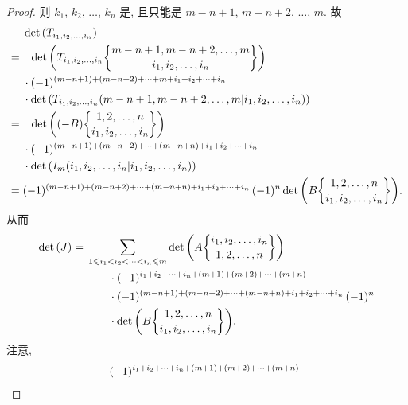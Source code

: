 \documentclass[../libro.tex]{subfiles}
\begin{document}
\begin{proof}
    则 \(k_1\), \(k_2\), \(\dots\), \(k_n\)
    是, 且只能是
    \(m-n+1\), \(m-n+2\), \(\dots\), \(m\).
    故
    \begin{align*}
        & \det {(T_{i_1,i_2,\dots,i_n})}
        \\
        = {} &
        \hphantom{\cdot\,\,}
        \det {\left(
                T_{i_1,i_2,\dots,i_n}
                \submat{m-n+1,m-n+2,\dots,m}{i_1,i_2,\dots,i_n}
        \right)}
        \\
        &
        \cdot (-1)^{(m-n+1) + (m-n+2) + \dots + m
        + i_1 + i_2 + \dots + i_n}
        \\
        &
        \cdot
        \det {(T_{i_1,i_2,\dots,i_n}
        ({m-n+1,m-n+2,\dots,m}|{i_1,i_2,\dots,i_n}))}
        \\
        = {} &
        \hphantom{\cdot\,\,}
        \det {\left(
                (-B)
                \submat{1,2,\dots,n}{i_1,i_2,\dots,i_n}
        \right)}
        \\
        & \cdot
        (-1)^{(m-n+1) + (m-n+2) + \dots + (m-n+n)
        + i_1 + i_2 + \dots + i_n}
        \\
        & \cdot
        \det {(I_m
        ({i_1,i_2,\dots,i_n}|{i_1,i_2,\dots,i_n}))}
        \\
        = {} &
        (-1)^{(m-n+1) + (m-n+2) + \dots + (m-n+n)
        + i_1 + i_2 + \dots + i_n}\,
        (-1)^n
        \det {\left(
                B
                \submat{1,2,\dots,n}{i_1,i_2,\dots,i_n}
        \right)}.
    \end{align*}
    从而
    \begin{align*}
        \det {(J)}
        = {} & \sum_{1 \leq i_1 < i_2 < \dots < i_n \leq m}
        {\det {\left(
                    A\submat{i_1,i_2,\dots,i_n}{1,2,\dots,n}
        \right)}}
        \\
        & \qquad
        \cdot
        (-1)^{i_1 + i_2 + \dots + i_n
        + (m+1) + (m+2) + \dots + (m+n)}
        \\
        & \qquad
        \cdot
        (-1)^{(m-n+1) + (m-n+2) + \dots + (m-n+n)
        + i_1 + i_2 + \dots + i_n}\, (-1)^n
        \\
        & \qquad
        \cdot
        \det {\left(
                B
                \submat{1,2,\dots,n}{i_1,i_2,\dots,i_n}
        \right)}.
    \end{align*}
    注意,
    \begin{align*}
        &
        \hphantom{\cdot\,\,}
        (-1)^{i_1 + i_2 + \dots + i_n
        + (m+1) + (m+2) + \dots + (m+n)}

\end{align*}
\end{proof}
\end{document}
